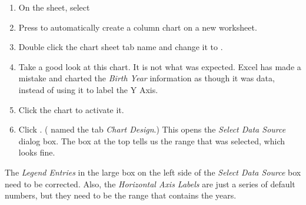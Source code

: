 \begin{enumbox}
	\begin{enumerate}
		\item On the  sheet, select 
		\item Press  to automatically create a column chart on a new worksheet.
		\item Double click the chart sheet tab name and change it to .
		\item Take a good look at this chart. It is not what was expected. Excel has made a mistake and charted the \textit{Birth Year} information as though it was data, instead of using it to label the Y Axis.
		\item Click the chart to activate it.
		\item Click . ( named the tab \textit{Chart Design}.) This opens the \textit{Select Data Source} dialog box. The box at the top tells us the range that was selected, which looks fine. 
	\end{enumerate}
\end{enumbox}
		
The \textit{Legend Entries} in the large box on the left side of the \textit{Select Data Source} box need to be corrected. Also, the \textit{Horizontal Axis Labels} are just a series of default numbers, but they need to be the range that contains the years.

